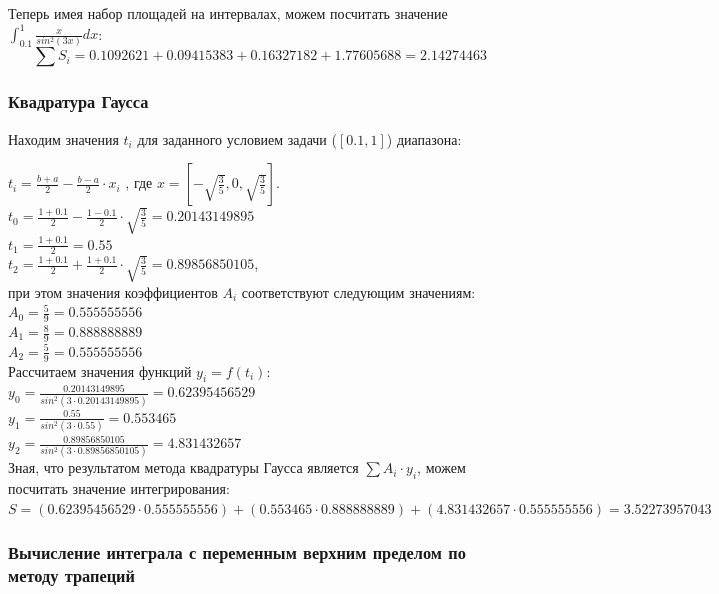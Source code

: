 \documentclass{article}
\begin{document}
Теперь имея набор площадей на интервалах, можем посчитать значение  
$\int_{0.1}^1 \frac{x}{sin^2(3x)}dx$:\\
\begin{displaymath} 
  \sum S_{i} = 0.1092621 + 0.09415383 + 0.16327182 + 1.77605688 = 2.14274463
\end{displaymath}

\subsubsection{Квадратура Гаусса}
Находим значения $t_{i}$ для заданного условием задачи ($[0.1, 1]$) диапазона:

$t_{i} = \frac{b + a}{2} - \frac{b - a}{2} \cdot x_{i}$ , где 
$x = [-\sqrt{\frac{3}{5}}, 0, \sqrt{\frac{3}{5}}]$.\\
$t_{0} = \frac{1 + 0.1}{2} - \frac{1 - 0.1}{2} \cdot \sqrt{\frac{3}{5}}
= 0.20143149895$ \\
$t_{1} = \frac{1 + 0.1}{2} = 0.55$  \\
$t_{2} = \frac{1 + 0.1}{2} + \frac{1 + 0.1}{2} \cdot \sqrt{\frac{3}{5}}
= 0.89856850105$, \\
при этом значения коэффициентов $A_{i}$ соответствуют следующим значениям: \\
$A_{0} = \frac{5}{9} = 0.555555556 $\\
$A_{1} = \frac{8}{9} = 0.888888889 $\\
$A_{2} = \frac{5}{9} = 0.555555556 $\\

Рассчитаем значения функций $y_{i} = f(t_{i})$: \\
$y_{0} = \frac{0.20143149895}{sin^2(3 \cdot 0.20143149895)} = 0.62395456529$\\
$y_{1} = \frac{0.55}{sin^2(3 \cdot 0.55)} = 0.553465$ \\
$y_{2} = \frac{0.89856850105}{sin^2(3 \cdot 0.89856850105)} = 4.831432657 $\\

Зная, что результатом метода квадратуры Гаусса является $\sum A_{i} \cdot
y_{i}$, можем посчитать значение интегрирования: \\

$S = (0.62395456529 \cdot 0.555555556) 
   + (0.553465 \cdot 0.888888889) 
   + (4.831432657 \cdot 0.555555556)
   = 3.52273957043
$

\subsubsection{Вычисление интеграла с переменным верхним пределом по
методу трапеций}
\end{document}
